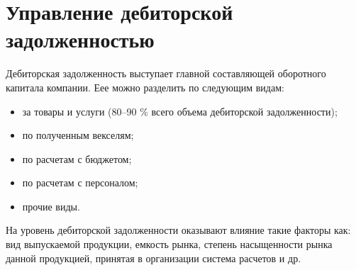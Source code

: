 \section{Управление дебиторской задолженностью}

Дебиторская задолженность выступает главной составляющей оборотного капитала компании. Еее можно разделить по следующим видам:
\begin{itemize}
	\item за товары и услуги (80--90 \% всего объема дебиторской задолженности);
	\item по полученным векселям;
	\item по расчетам с бюджетом;
	\item по расчетам с персоналом;
	\item прочие виды.
\end{itemize}

На уровень дебиторской задолженности оказывают влияние такие факторы как: вид выпускаемой продукции, емкость рынка, степень насыщенности рынка данной продукцией, принятая в организации система расчетов и др.




